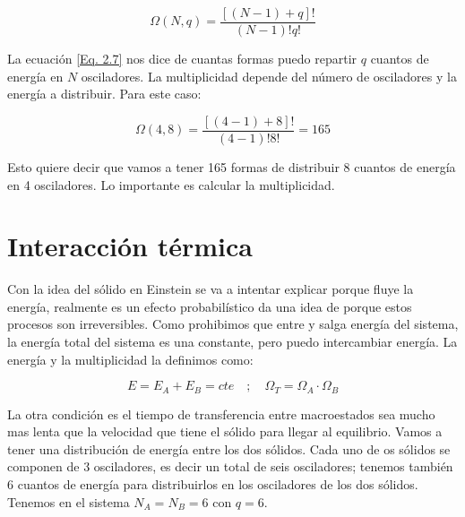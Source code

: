 \documentclass[11pt,fleqn]{book}
\begin{document}
\begin{equation}
    \Omega(N,q)=\frac{\left[(N-1)+q\right]!}{(N-1)!q!}
    \label{Eq. 2.7}
\end{equation}

La ecuación \ref{Eq. 2.7} nos dice de cuantas formas puedo repartir $q$ cuantos de energía en $N$ osciladores. La multiplicidad depende del número de osciladores y la energía a distribuir. Para este caso:

\begin{equation*}
    \Omega(4,8)=\frac{\left[(4-1)+8\right]!}{(4-1)!8!}=165
\end{equation*}

Esto quiere decir que vamos a tener 165 formas de distribuir 8 cuantos de energía en 4 osciladores. Lo importante es calcular la multiplicidad. 

\section{Interacción térmica}

Con la idea del sólido en Einstein se va a intentar explicar porque fluye la energía, realmente es un efecto probabilístico  da una idea de porque estos procesos son irreversibles. Como prohibimos que entre y salga energía del sistema, la energía total del sistema es una constante, pero puedo intercambiar energía. La energía y la multiplicidad la definimos como:



\begin{equation}
    E=E_{A}+E_{B}=cte\quad;\quad\Omega_{T}=\Omega_{A}\cdot\Omega_{B}
    \label{Eq. 2.8}
\end{equation}

La otra condición es el tiempo de transferencia entre macroestados sea mucho mas lenta que la velocidad que tiene el sólido para llegar al equilibrio. Vamos a tener una distribución de energía entre los dos sólidos. Cada uno de os sólidos se componen de 3 osciladores, es decir un total de seis osciladores; tenemos también 6 cuantos de energía para distribuirlos en los osciladores de los dos sólidos. Tenemos en el sistema $N_{A}=N_{B}=6$ con $q=6$.
\end{document}
